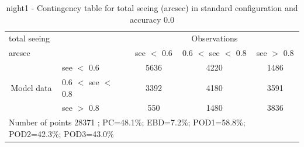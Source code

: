 \begin{table}[p!]
\begin{center}
\begin{tabular}{llccc}
\hline
{total seeing}                                       &                                                    & \multicolumn{3}{c}{Observations}                 \\
{arcsec}                                       &                             & see $<$ 0.6   & 0.6 $<$ see $<$ 0.8 & see $>$ 0.8 \\
\hline
\multicolumn{1}{c}{\multirow{3}{*}{Model data}}  & see $<$ 0.6             & 5636                & 4220                       & 1486              \\
                                                 & 0.6  $<$ see $<$ 0.8 & 3392                & 4180                       & 3591              \\
                                                 & see $>$ 0.8             & 550                & 1480                       & 3836              \\
\hline
\multicolumn{5}{l}{ Number of points        28371 ; PC=48.1\%; EBD=7.2\%; POD1=58.8\%; POD2=42.3\%; POD3=43.0\%}
\end{tabular}
\end{center}
\caption{night1 - Contingency table for  total seeing (arcsec) in standard configuration and accuracy 0.0}
\label{tab:contingencyseeBEF:night1}
\end{table}
